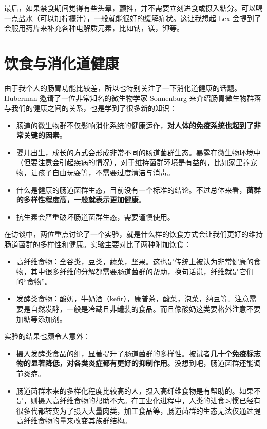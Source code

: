 \documentclass{report}
\begin{document}
最后，如果禁食期间觉得有些头晕，颤抖，并不需要立刻进食或摄入糖分。可以喝一点盐水（可以加柠檬汁），一般就能很好的缓解症状。这让我想起 Lex 会提到了会服用药片来补充各种电解质元素，比如钠，镁，钾等。

\section{饮食与消化道健康}

由于我个人的肠胃功能比较差，所以也特别关注了一下消化道健康的话题。Huberman 邀请了一位非常知名的微生物学家 Sonnenburg 来介绍肠胃微生物群落与我们的健康之间的关系，也是学到了很多新的知识：

\begin{itemize}
    \item 肠道的微生物群不仅影响消化系统的健康运作，\textbf{对人体的免疫系统也起到了非常关键的因素}。
    \item 婴儿出生，成长的方式会形成非常不同的肠道菌群生态。暴露在微生物环境中（但要注意会引起疾病的情况），对于维持菌群环境是有益的，比如家里养宠物，让孩子自由玩耍等，不需要过度清洁与消毒。
    \item 什么是健康的肠道菌群生态，目前没有一个标准的结论。不过总体来看，\textbf{菌群的多样性程度高，一般就表示更加健康}。
    \item 抗生素会严重破坏肠道菌群生态，需要谨慎使用。
\end{itemize}

在访谈中，两位重点讨论了一个实验，就是什么样的饮食方式会让我们更好的维持肠道菌群的多样性和健康。实验主要对比了两种附加饮食：

\begin{itemize}
    \item 高纤维食物：全谷类，豆类，蔬菜，坚果。这也是传统上被认为非常健康的食物，其中很多纤维的分解都需要肠道菌群的帮助，换句话说，纤维就是它们的“食物”。
    \item 发酵类食物：酸奶，牛奶酒（kefir），康普茶，酸菜，泡菜，纳豆等。注意需要是自然发酵，一般是冷藏且非罐装的食品。而且像酸奶这类要格外注意不要加糖等添加剂。
\end{itemize}

实验的结果也颇令人意外：

\begin{itemize}
    \item 摄入发酵类食品的组，显著提升了肠道菌群的多样性。被试者\textbf{几十个免疫标志物的显著降低，对各类炎症都有更好的抑制作用}。没想到吧，肠道菌群还能调节炎症。
    \item 肠道菌群本来的多样化程度比较高的人，摄入高纤维食物是有帮助的。如果不是，则摄入高纤维食物的帮助不大。在工业化进程中，人类的进食习惯已经有很多代都转变为了摄入大量肉类，加工食品等，肠道菌群的生态无法仅通过提高纤维食物的量来改变其族群结构。
\end{itemize}
\end{document}
